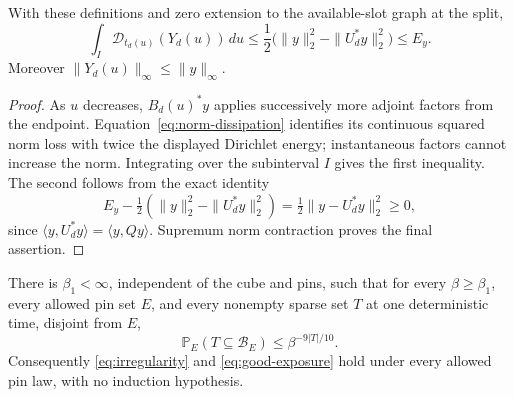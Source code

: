 \begin{lemma}\label{lem:suffix-energy}
With these definitions and zero extension to the available-slot
graph at the split,
\begin{equation}\label{eq:suffix-energy}
 \int_I\mathcal D_{t_d(u)}(Y_d(u))\,du
 \le\frac12\bigl(\|y\|_2^2-\|U_d^*y\|_2^2\bigr)
 \le E_y.
\end{equation}
Moreover \(\|Y_d(u)\|_\infty\le\|y\|_\infty\).
\end{lemma}

\begin{proof}
As \(u\) decreases, \(B_d(u)^*y\) applies successively more
adjoint factors from the endpoint.  Equation~\eqref{eq:norm-dissipation}
identifies its continuous squared norm loss with twice the displayed
Dirichlet energy; instantaneous factors cannot increase the norm.
Integrating over the subinterval \(I\) gives the first inequality.
The second follows from the exact identity
\[
 E_y-\tfrac12(\|y\|_2^2-\|U_d^*y\|_2^2)
 =\tfrac12\|y-U_d^*y\|_2^2\ge0,
\]
since \(\langle y,U_d^*y\rangle=\langle y,Qy\rangle\).
Supremum norm contraction proves the final assertion.
\end{proof}

\begin{theorem}\label{thm:sparse-pins}
There is \(\beta_1<\infty\), independent of the cube and pins,
such that for every \(\beta\ge\beta_1\), every allowed pin set
\(E\), and every nonempty sparse set \(T\) at one deterministic
time, disjoint from \(E\),
\begin{equation}\label{eq:sparse-pins}
 \mathbb P_E(T\subseteq\mathcal B_E)
 \le\beta^{-9|T|/10}.
\end{equation}
Consequently \eqref{eq:irregularity} and \eqref{eq:good-exposure}
hold under every allowed pin law, with no induction hypothesis.
\end{theorem}

